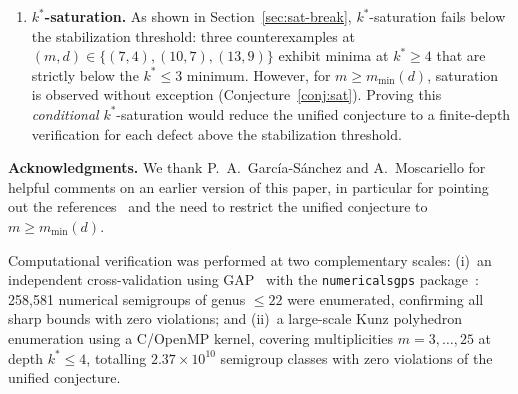 \documentclass[11pt]{amsart}
\theoremstyle{definition}
\theoremstyle{remark}
\begin{document}
\begin{enumerate}[nosep]
  \item \textbf{$k^*$-saturation.}
    As shown in Section~\ref{sec:sat-break}, $k^*$-saturation fails
    below the stabilization threshold: three counterexamples at
    $(m,d) \in \{(7,4), (10,7), (13,9)\}$ exhibit minima at $k^* \ge 4$
    that are strictly below the $k^* \le 3$ minimum.
    However, for $m \ge m_{\min}(d)$, saturation is observed without exception
    (Conjecture~\ref{conj:sat}).
    Proving this \emph{conditional} $k^*$-saturation would reduce
    the unified conjecture to a finite-depth verification for each defect
    above the stabilization threshold.
\end{enumerate}

\bigskip
\noindent\textbf{Acknowledgments.}
We thank P.~A.~Garc\'ia-S\'anchez and A.~Moscariello for helpful
comments on an earlier version of this paper, in particular for
pointing out the references~\cite{Dhayni2018, Delgado2019} and the
need to restrict the unified conjecture to $m \ge m_{\min}(d)$.

Computational verification was performed at two complementary scales:
(i)~an independent cross-validation using GAP~\cite{GAP} with the
\texttt{numericalsgps} package~\cite{NumericalSgps}:
258{,}581 numerical semigroups of genus $\le 22$ were enumerated,
confirming all sharp bounds with zero violations; and
(ii)~a large-scale Kunz polyhedron enumeration using a C/OpenMP kernel,
covering multiplicities $m = 3, \ldots, 25$ at depth $k^* \le 4$,
totalling $2.37 \times 10^{10}$ semigroup classes with zero violations
of the unified conjecture.




\end{document}
